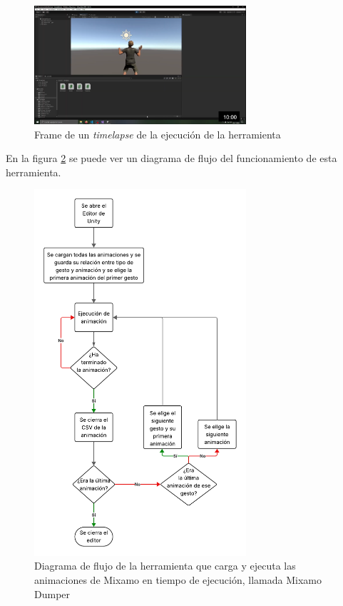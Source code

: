 \begin{figure}[H]
    \centering
    \includegraphics[width=0.7\textwidth]{Imagenes/Bitmap/remy_bailon.png}
    \caption{Frame de un \textit{timelapse} de la ejecución de la herramienta}
    \label{fig:frame-timelapse}
\end{figure}

En la figura \ref{fig:MixamoDumper} se puede ver un diagrama de flujo del funcionamiento de esta herramienta.

\begin{figure}[H]
    \centering
    \includegraphics[width=0.7\textwidth]{Imagenes/Vectorial/FlujoMixamoDumper.pdf}
    \caption{Diagrama de flujo de la herramienta que carga y ejecuta las animaciones de Mixamo en tiempo de ejecución, llamada Mixamo Dumper}
    \label{fig:MixamoDumper}
\end{figure}

